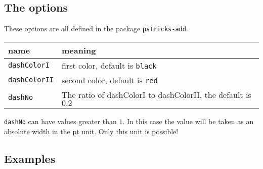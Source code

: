 \begin{LTXexample}[width=0.2\linewidth]
%
\hspace{9cm}
\end{LTXexample}


\subsection{The options}

These options are all defined in the package \verb|pstricks-add|.

\medskip
\begin{tabularx}{\linewidth}{l|X}
name & meaning\\\hline
\verb|dashColorI| & first color, default is \verb|black|\tabularnewline
\verb|dashColorII| & second color, default is \verb|red|\tabularnewline
\verb|dashNo| & The ratio of dashColorI to dashColorII, the default is $0.2$\tabularnewline
\end{tabularx}
\medskip

\verb|dashNo| can have values greater than $1$. In this case the value will be taken as an absolute width in the pt unit. Only this unit is possible!

\subsection{Examples}
\begin{LTXexample}[width=4.5cm]
\hspace*{3cm}%
\end{LTXexample}

\begin{LTXexample}[width=4.5cm]
\hspace*{3cm}%
\end{LTXexample}

\begin{LTXexample}[width=4.5cm]
\hspace*{3cm}%
\end{LTXexample}

